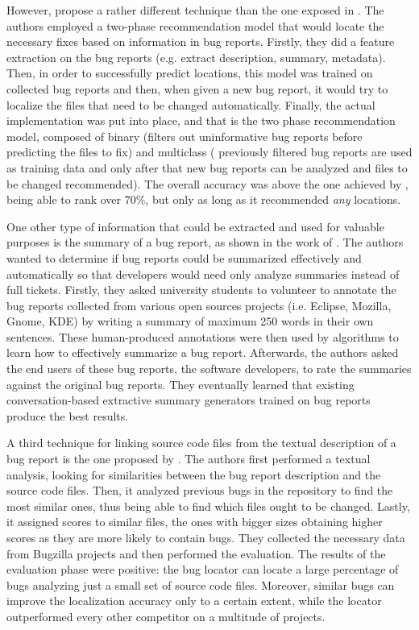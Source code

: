 \documentclass{mprop}
\begin{document}
However, \citet{kim2013should} propose a rather different technique than the one
exposed in \citet{bettenburg2012using}. The authors employed a two-phase
recommendation model that would locate the necessary fixes based on information
in bug reports. Firstly, they did a feature extraction on the bug reports (e.g. 
extract description, summary, metadata). Then, in order to successfully predict
locations, this model was trained on collected bug reports and then, when given
a new bug report, it would try to localize the files that need to be changed 
automatically. Finally, the actual implementation was put into place, and that
is the two phase recommendation model, composed of binary (filters out 
uninformative bug reports before predicting the files to fix) and multiclass (
previously filtered bug reports are used as training data and only after that
new bug reports can be analyzed and files to be changed recommended). The 
overall accuracy was above the one achieved by \citet{bettenburg2012using}, 
being able to rank over 70\%, but only as long as it recommended \emph{any} 
locations.

One other type of information that could be extracted and used for valuable
purposes is the summary of a bug report, as shown in the work of 
\citet{rastkar2010summarizing}. The authors wanted to determine if bug reports
could be summarized effectively and automatically so that developers would
need only analyze summaries instead of full tickets. Firstly, they asked
university students to volunteer to annotate the bug reports collected from
various open sources projects (i.e. Eclipse, Mozilla, Gnome, KDE) by writing
a summary of maximum 250 words in their own sentences. These human-produced 
annotations were then used by algorithms to learn how to effectively summarize a 
bug report.  Afterwards, the authors asked the end users of these bug reports, the 
software developers, to rate the summaries against the original bug reports.
They eventually learned that existing conversation-based extractive summary
generators trained on bug reports produce the best results.

A third technique for linking source code files from the textual description of a 
bug report is the one proposed by \citet{zhou2012should}. The authors
first performed a textual analysis, looking for similarities between the bug 
report description and the source code files. Then, it analyzed previous bugs in 
the repository to find the most similar ones, thus being able to find which files 
ought to be changed. Lastly, it assigned scores to similar files, the ones with 
bigger sizes obtaining higher scores as they are more likely to contain bugs. They 
collected the necessary data from Bugzilla projects and then performed the 
evaluation. The results of the evaluation phase were positive: the bug locator
can locate a large percentage of bugs analyzing just a small set of source code
files. Moreover, similar bugs can improve the localization accuracy only to a 
certain extent, while the locator outperformed every other competitor on a 
multitude of projects. 
\end{document}
